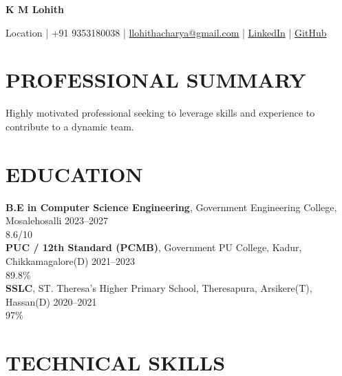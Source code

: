 \documentclass[9pt,a4paper]{extarticle}
\begin{document}

\begin{center}

{\Large \textbf{K M Lohith}}

\vspace{1pt}

Location |
+91 9353180038 |
\href{mailto:llohithacharya@gmail.com}{llohithacharya@gmail.com} |
\href{https://linkedin.com/in/username}{LinkedIn} |
\href{https://github.com/username}{GitHub}

\end{center}


\section*{PROFESSIONAL SUMMARY}

Highly motivated professional seeking to leverage skills and experience to contribute to a dynamic team.


\section*{EDUCATION}

\noindent \textbf{B.E in Computer Science Engineering}, Government Engineering College, Mosalehosalli \hfill 2023–2027\\
\null \hfill 8.6/10\vspace{1pt}\\
\noindent \textbf{PUC / 12th Standard (PCMB)}, Government PU College, Kadur, Chikkamagalore(D) \hfill 2021–2023\\
\null \hfill 89.8\%\vspace{1pt}\\
\noindent \textbf{SSLC}, ST. Theresa’s Higher Primary School, Theresapura, Arsikere(T), Hassan(D) \hfill 2020–2021\\
\null \hfill 97\%\vspace{1pt}\\



\section*{TECHNICAL SKILLS}
\end{document}
